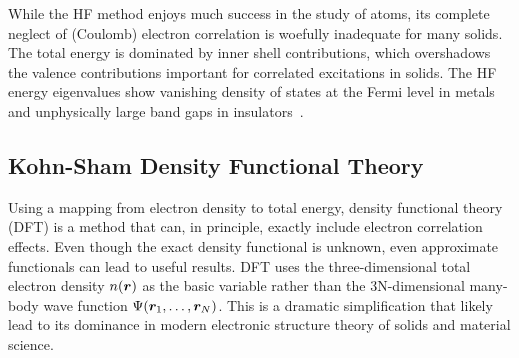 While the HF method enjoys much success in the study of atoms, its complete neglect of (Coulomb) electron correlation is woefully inadequate for many solids. The total energy is dominated by inner shell contributions, which overshadows the valence contributions important for correlated excitations in solids.
The HF energy eigenvalues show vanishing density of states at the Fermi level in metals and unphysically large band gaps in insulators~\cite{Perdew1981}.

\subsection{Kohn-Sham Density Functional Theory}

Using a mapping from electron density to total energy, density functional theory (DFT) is a method that can, in principle, exactly include electron correlation effects.
Even though the exact density functional is unknown, even approximate functionals can lead to useful results.
DFT uses the three-dimensional total electron density $n(\boldsymbol{r})$ as the basic variable rather than the 3N-dimensional many-body wave function $\Psi(\boldsymbol{r}_1,\dots,\boldsymbol{r}_N)$. This is a dramatic simplification that likely lead to its dominance in modern electronic structure theory of solids and material science.

